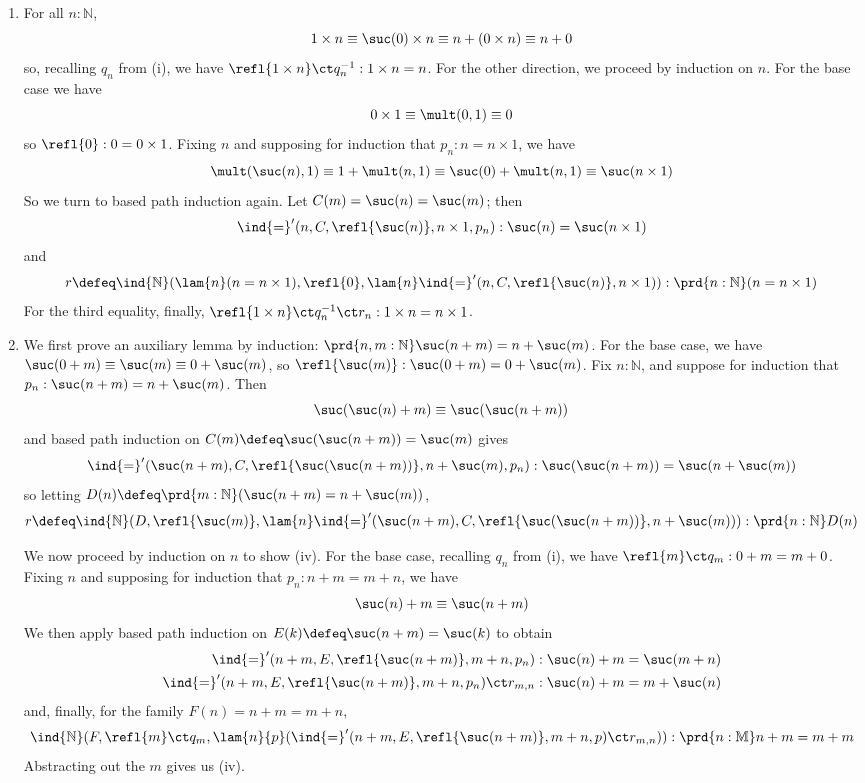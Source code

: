 \begin{enumerate}
\item For all $n : \mathbb{N}$,
\[
  1 \times n \equiv \suc(0) \times n 
  \equiv n + (0 \times n) \equiv n + 0
\]
so, recalling $q_{n}$ from (i), we have $\refl{1 \times n} \ct q^{-1}_{n} : 1
\times n = n$.  For the other direction, we proceed by induction on $n$.  For
the base case we have
\[
  0 \times 1 \equiv \mult(0, 1) \equiv 0
\]
so $\refl{0} : 0 = 0 \times 1$.  Fixing $n$ and supposing for induction that $p_{n} : n = n
\times 1$, we have
\[
  \mult(\suc(n), 1) 
  \equiv 1 + \mult(n, 1) 
  \equiv \suc(0) + \mult(n, 1)
  \equiv \suc(n \times 1)
\]
So we turn to based path induction again.  Let $C(m) = \suc(n) = \suc(m)$; then
\[
  \ind{=}'(n, C, \refl{\suc(n)}, n \times 1, p_{n})
  : \suc(n) = \suc(n \times 1)
\]
and
\[
  r \defeq \ind{\mathbb{N}}(\lam{n}(n = n \times 1), \refl{0}, 
  \lam{n}\ind{=}'(n, C, \refl{\suc(n)}, n \times 1))
  : \prd{n:\mathbb{N}}(n = n \times 1)
\]
For the third equality, finally, $\refl{1 \times n} \ct q_{n}^{-1} \ct r_{n} : 1
\times n = n \times 1$.

\item We first prove an auxiliary lemma by induction: $\prd{n,
m:\mathbb{N}} \suc(n+m) = n + \suc(m)$.  For the base case, we have $\suc(0+m)
\equiv \suc(m) \equiv 0 + \suc(m)$, so $\refl{\suc(m)} : \suc(0+m) = 0 +
\suc(m)$.  Fix $n : \mathbb{N}$, and suppose for induction that $p_{n} : \suc(n
+ m) = n + \suc(m)$.  Then
\[
  \suc(\suc(n) + m) \equiv \suc(\suc(n+m))
\]
and based path induction on $C(m) \defeq \suc(\suc(n + m)) = \suc(m)$ gives
\[
  \ind{=}'(\suc(n+m), C, \refl{\suc(\suc(n+m))}, n + \suc(m), p_{n})
  : \suc(\suc(n+m)) = \suc(n + \suc(m))
\]
so letting $D(n) \defeq \prd{m : \mathbb{N}}(\suc(n+m) = n + \suc(m))$,
\[
  r \defeq \ind{\mathbb{N}}(D, \refl{\suc(m)}, 
  \lam{n}\ind{=}'(\suc(n+m), C, \refl{\suc(\suc(n+m))}, n + \suc(m))
  )
  : \prd{n:\mathbb{N}} D(n)
\]

We now proceed by induction on $n$ to show (iv).  For the base case, recalling
$q_{n}$ from (i), we have $\refl{m} \ct q_{m} : 0 + m = m + 0$.  Fixing $n$ and
supposing for induction that $p_{n} : n + m = m + n$, we have
\[
  \suc(n) + m \equiv \suc(n + m)
\]
We then apply based path induction on $E(k) \defeq \suc(n+m) = \suc(k)$ to
obtain
\begin{align*}
  \ind{=}'(n+m, E, \refl{\suc(n+m)}, m+n, p_{n}) &: \suc(n)+m = \suc(m+n) \\
  \ind{=}'(n+m, E, \refl{\suc(n+m)}, m+n, p_{n}) \ct r_{m,n} &: \suc(n)+m = m +
  \suc(n)
\end{align*}
and, finally, for the family $F(n) = n+m = m + n$,
\[
\ind{\mathbb{N}}(F, \refl{m} \ct q_{m}, 
\lam{n}{p}(
  \ind{=}'(n+m, E, \refl{\suc(n+m)}, m+n, p) \ct r_{m,n}
)
) : \prd{n:\mathbb{M}}n+m = m+m
\]
Abstracting out the $m$ gives us (iv).


\end{enumerate}
